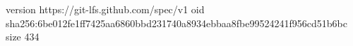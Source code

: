 version https://git-lfs.github.com/spec/v1
oid sha256:6be012fe1ff7425aa6860bbd231740a8934ebbaa8fbe99524241f956cd51b6bc
size 434
